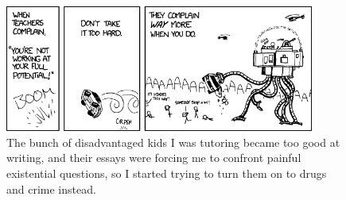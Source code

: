 \documentclass[letterpaper,12pt]{article}
\begin{document}
\begin{figure}[ht!]
	\centering
	\includegraphics[width=4in]{potential.png}
    \caption*{The bunch of disadvantaged kids I was tutoring became too good at writing, and their essays were forcing me to confront painful existential questions, so I started trying to turn them on to drugs and crime instead.}
\end{figure}
\end{document}

